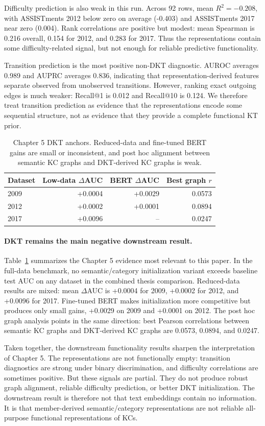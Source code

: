 Difficulty prediction is also weak in this run. Across 92 rows, mean $R^2=-0.208$, with ASSISTments 2012 below zero on average (-0.403) and ASSISTments 2017 near zero (0.004). Rank correlations are positive but modest: mean Spearman is 0.216 overall, 0.154 for 2012, and 0.283 for 2017. Thus the representations contain some difficulty-related signal, but not enough for reliable predictive functionality.

Transition prediction is the most positive non-DKT diagnostic. AUROC averages 0.989 and AUPRC averages 0.836, indicating that representation-derived features separate observed from unobserved transitions. However, ranking exact outgoing edges is much weaker: Recall@1 is 0.012 and Recall@10 is 0.124. We therefore treat transition prediction as evidence that the representations encode some sequential structure, not as evidence that they provide a complete functional KT prior.

\begin{table}[t]
\centering
\small
\begin{tabular}{lrrr}
\toprule
Dataset & Low-data $\Delta$AUC & BERT $\Delta$AUC & Best graph $r$ \\
\midrule
2009 & +0.0004 & +0.0029 & 0.0573 \\
2012 & +0.0002 & +0.0001 & 0.0894 \\
2017 & +0.0096 & -- & 0.0247 \\
\bottomrule
\end{tabular}
\caption{Chapter 5 DKT anchors. Reduced-data and fine-tuned BERT gains are small or inconsistent, and post hoc alignment between semantic KC graphs and DKT-derived KC graphs is weak.}
\label{tab:ch5}
\end{table}

\paragraph{DKT remains the main negative downstream result.}
Table~\ref{tab:ch5} summarizes the Chapter 5 evidence most relevant to this paper. In the full-data benchmark, no semantic/category initialization variant exceeds baseline test AUC on any dataset in the combined thesis comparison. Reduced-data results are mixed: mean $\Delta$AUC is +0.0004 for 2009, +0.0002 for 2012, and +0.0096 for 2017. Fine-tuned BERT makes initialization more competitive but produces only small gains, +0.0029 on 2009 and +0.0001 on 2012. The post hoc graph analysis points in the same direction: best Pearson correlations between semantic KC graphs and DKT-derived KC graphs are 0.0573, 0.0894, and 0.0247.

Taken together, the downstream functionality results sharpen the interpretation of Chapter 5. The representations are not functionally empty: transition diagnostics are strong under binary discrimination, and difficulty correlations are sometimes positive. But these signals are partial. They do not produce robust graph alignment, reliable difficulty prediction, or better DKT initialization. The downstream result is therefore not that text embeddings contain no information. It is that member-derived semantic/category representations are not reliable all-purpose functional representations of KCs.
